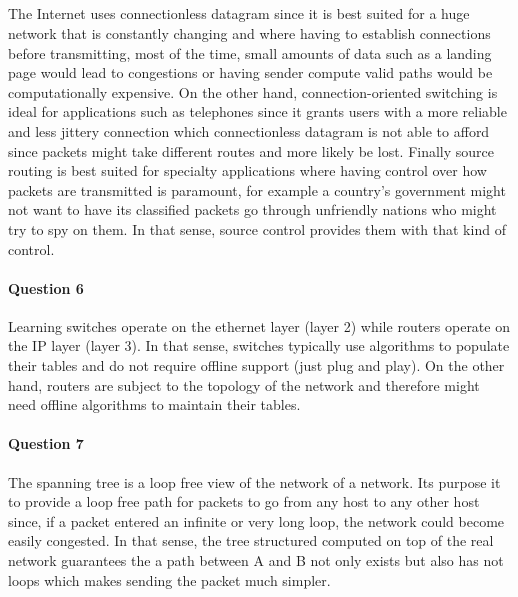 \documentclass[12pt]{article}
\begin{document}
\subparagraph*{}
The Internet uses connectionless datagram since it is best suited for a huge network that is
constantly changing and where having to establish connections before transmitting, most of the time,
small amounts of data such as a landing page would lead to congestions or having sender compute valid
paths would be computationally expensive. On the other hand, connection-oriented switching is ideal
for applications such as telephones since it grants users with a more reliable and less jittery
connection which connectionless datagram is not able to afford since packets might take different routes
and more likely be lost. Finally source routing is best suited for specialty applications where having
control over how packets are transmitted is paramount, for example a country's government might not
want to have its classified packets go through unfriendly nations who might try to spy on them. In that
sense, source control provides them with that kind of control.

\paragraph*{Question 6}
Learning switches operate on the ethernet layer (layer 2) while routers operate on the IP layer
(layer 3). In that sense, switches typically use algorithms to populate their tables and do not
require offline support (just plug and play). On the other hand, routers are subject to the topology
of the network and therefore might need offline algorithms to maintain their tables.

\pagebreak

\paragraph*{Question 7}
The spanning tree is a loop free view of the network of a network. Its purpose it to provide a loop
free path for packets to go from any host to any other host since, if a packet entered an infinite
or very long loop, the network could become easily congested. In that sense, the tree structured
computed on top of the real network guarantees the a path between A and B not only exists but also
has not loops which makes sending the packet much simpler.

\end{document}
